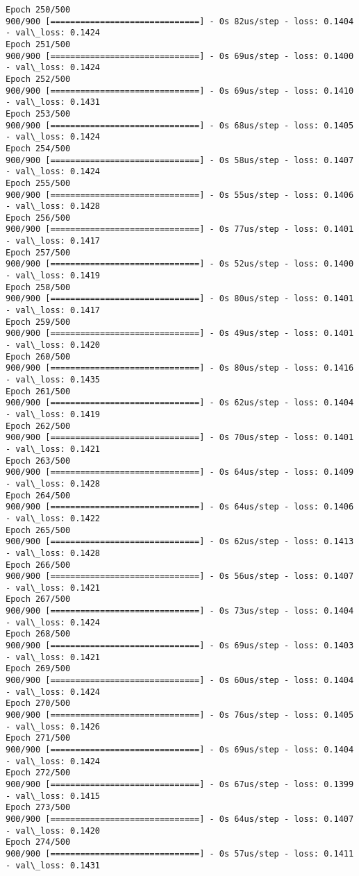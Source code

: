 \documentclass[11pt]{article}
\begin{document}
\begin{Verbatim}[commandchars=\\\{\}]
Epoch 250/500
900/900 [==============================] - 0s 82us/step - loss: 0.1404 - val\_loss: 0.1424
Epoch 251/500
900/900 [==============================] - 0s 69us/step - loss: 0.1400 - val\_loss: 0.1424
Epoch 252/500
900/900 [==============================] - 0s 69us/step - loss: 0.1410 - val\_loss: 0.1431
Epoch 253/500
900/900 [==============================] - 0s 68us/step - loss: 0.1405 - val\_loss: 0.1424
Epoch 254/500
900/900 [==============================] - 0s 58us/step - loss: 0.1407 - val\_loss: 0.1424
Epoch 255/500
900/900 [==============================] - 0s 55us/step - loss: 0.1406 - val\_loss: 0.1428
Epoch 256/500
900/900 [==============================] - 0s 77us/step - loss: 0.1401 - val\_loss: 0.1417
Epoch 257/500
900/900 [==============================] - 0s 52us/step - loss: 0.1400 - val\_loss: 0.1419
Epoch 258/500
900/900 [==============================] - 0s 80us/step - loss: 0.1401 - val\_loss: 0.1417
Epoch 259/500
900/900 [==============================] - 0s 49us/step - loss: 0.1401 - val\_loss: 0.1420
Epoch 260/500
900/900 [==============================] - 0s 80us/step - loss: 0.1416 - val\_loss: 0.1435
Epoch 261/500
900/900 [==============================] - 0s 62us/step - loss: 0.1404 - val\_loss: 0.1419
Epoch 262/500
900/900 [==============================] - 0s 70us/step - loss: 0.1401 - val\_loss: 0.1421
Epoch 263/500
900/900 [==============================] - 0s 64us/step - loss: 0.1409 - val\_loss: 0.1428
Epoch 264/500
900/900 [==============================] - 0s 64us/step - loss: 0.1406 - val\_loss: 0.1422
Epoch 265/500
900/900 [==============================] - 0s 62us/step - loss: 0.1413 - val\_loss: 0.1428
Epoch 266/500
900/900 [==============================] - 0s 56us/step - loss: 0.1407 - val\_loss: 0.1421
Epoch 267/500
900/900 [==============================] - 0s 73us/step - loss: 0.1404 - val\_loss: 0.1424
Epoch 268/500
900/900 [==============================] - 0s 69us/step - loss: 0.1403 - val\_loss: 0.1421
Epoch 269/500
900/900 [==============================] - 0s 60us/step - loss: 0.1404 - val\_loss: 0.1424
Epoch 270/500
900/900 [==============================] - 0s 76us/step - loss: 0.1405 - val\_loss: 0.1426
Epoch 271/500
900/900 [==============================] - 0s 69us/step - loss: 0.1404 - val\_loss: 0.1424
Epoch 272/500
900/900 [==============================] - 0s 67us/step - loss: 0.1399 - val\_loss: 0.1415
Epoch 273/500
900/900 [==============================] - 0s 64us/step - loss: 0.1407 - val\_loss: 0.1420
Epoch 274/500
900/900 [==============================] - 0s 57us/step - loss: 0.1411 - val\_loss: 0.1431

\end{Verbatim}
\end{document}
